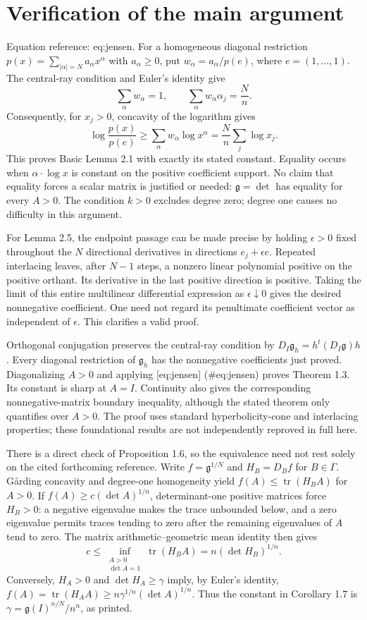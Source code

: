 \documentclass[10pt]{article}
\begin{document}
\section*{Verification of the main argument}
Equation reference: eq:jensen. For a homogeneous diagonal restriction \(p(x)=\sum_{|\alpha|=N}a_\alpha x^\alpha\) with \(a_\alpha\geq0\), put \(w_\alpha=a_\alpha/p(e)\), where \(e=(1,\ldots,1)\). The central-ray condition and Euler’s identity give \[\sum_\alpha w_\alpha=1,\qquad
 \sum_\alpha w_\alpha\alpha_j=\frac{N}{n}.\] Consequently, for \(x_j>0\), concavity of the logarithm gives \[\log\frac{p(x)}{p(e)}
 \geq \sum_\alpha w_\alpha\log x^\alpha
 =\frac{N}{n}\sum_j\log x_j .
 \] This proves Basic Lemma 2.1 with exactly its stated constant. Equality occurs when \(\alpha\cdot\log x\) is constant on the positive coefficient support. No claim that equality forces a scalar matrix is justified or needed: \(\mathfrak g=\det\) has equality for every \(A>0\). The condition \(k>0\) excludes degree zero; degree one causes no difficulty in this argument.\par
For Lemma 2.5, the endpoint passage can be made precise by holding \(\epsilon>0\) fixed throughout the \(N\) directional derivatives in directions \(e_j+\epsilon e\). Repeated interlacing leaves, after \(N-1\) steps, a nonzero linear polynomial positive on the positive orthant. Its derivative in the last positive direction is positive. Taking the limit of this entire multilinear differential expression as \(\epsilon\downarrow0\) gives the desired nonnegative coefficient. One need not regard its penultimate coefficient vector as independent of \(\epsilon\). This clarifies a valid proof.\par
Orthogonal conjugation preserves the central-ray condition by \(D_I\mathfrak g_h=h^t(D_I\mathfrak g)h\). Every diagonal restriction of \(\mathfrak g_h\) has the nonnegative coefficients just proved. Diagonalizing \(A>0\) and applying [eq:jensen] (\#eq:jensen) proves Theorem 1.3. Its constant is sharp at \(A=I\). Continuity also gives the corresponding nonnegative-matrix boundary inequality, although the stated theorem only quantifies over \(A>0\). The proof uses standard hyperbolicity-cone and interlacing properties; these foundational results are not independently reproved in full here.\par
There is a direct check of Proposition 1.6, so the equivalence need not rest solely on the cited forthcoming reference. Write \(f=\mathfrak g^{1/N}\) and \(H_B=D_Bf\) for \(B\in\Gamma\). Gårding concavity and degree-one homogeneity yield \(f(A)\leq\operatorname{tr}(H_BA)\) for \(A>0\). If \(f(A)\geq c(\det A)^{1/n}\), determinant-one positive matrices force \(H_B>0\): a negative eigenvalue makes the trace unbounded below, and a zero eigenvalue permits traces tending to zero after the remaining eigenvalues of \(A\) tend to zero. The matrix arithmetic–geometric mean identity then gives \[c\leq\inf_{\substack{A>0\\\det A=1}}\operatorname{tr}(H_BA)
       =n(\det H_B)^{1/n}.\] Conversely, \(H_A>0\) and \(\det H_A\geq\gamma\) imply, by Euler’s identity, \(f(A)=\operatorname{tr}(H_AA)\geq n\gamma^{1/n}(\det A)^{1/n}\). Thus the constant in Corollary 1.7 is \(\gamma=\mathfrak g(I)^{n/N}/n^n\), as printed.\par
\end{document}
